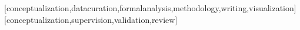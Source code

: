 \documentclass[spanish]{textolivre}
\begin{document}
\printbibliography\label{sec-bib}
\begin{contributors}

[conceptualization,datacuration,formalanalysis,methodology,writing,visualization]
[conceptualization,supervision,validation,review]
\end{contributors}
\end{document}
